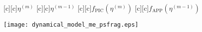 \documentclass{article}
\begin{document}
\begin{figure}[htb]
  \begin{center}


        [c][c]{\hspace{-2mm}$\eta^{(m)}$}
        [c][c]{\hspace{7mm}$\eta^{(m-1)}$}
        [c][c]{$f_{\mathrm{PIC}}(\eta^{(m)})$}
        [c][c]{$f_{\mathrm{APP}}(\eta^{(m-1)})$}

    \texttt{[image: dynamical\_model\_me\_psfrag.eps]}
    \end{center}
\end{figure}
\end{document}
